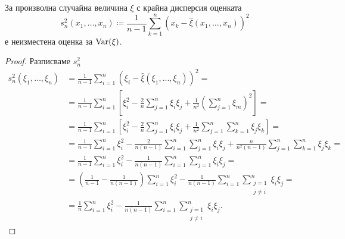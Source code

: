 \documentclass[numbers=endperiod, bibliography=totocnumbered]{scrartcl}
\begin{document}
\begin{proposition}\label{thm:corrected_variation_is_unbiased_estimator}
  За произволна случайна величина \( \xi \) с крайна дисперсия оценката
  \begin{equation*}
    s_n^2(x_1, \ldots, x_n) \coloneqq \frac 1 {n-1} \sum_{k=1}^n {(x_k - \hat \xi(x_1, \ldots, x_n))}^2
  \end{equation*}
  е неизместена оценка за \( \operatorname{Var}(\xi) \).
\end{proposition}
\begin{proof}
  Разписваме \( s_n^2 \)
  \begingroup
  \allowdisplaybreaks
  \begin{align*}
    s_n^2(\xi_1, \ldots, \xi_n)
    &=
    \frac 1 {n-1} \sum_{i=1}^n {(\xi_i - \hat \xi(\xi_1, \ldots, \xi_n))}^2
    = \\ &=
    \frac 1 {n-1} \sum_{i=1}^n \left[\xi_i^2 - \frac 2 n \sum_{j=1}^n \xi_i \xi_j + \frac 1 {n^2} {\left( \sum_{j=1}^n \xi_m \right)}^2 \right]
    = \\ &=
    \frac 1 {n-1} \sum_{i=1}^n \left[\xi_i^2 - \frac 2 n \sum_{j=1}^n \xi_i \xi_j + \frac 1 {n^2} \sum_{j=1}^n \sum_{k=1}^n \xi_j \xi_k \right]
    = \\ &=
    \frac 1 {n-1} \sum_{i=1}^n \xi_i^2 - \frac 2 {n(n-1)} \sum_{i=1}^n \sum_{j=1}^n \xi_i \xi_j + \frac n {n^2 (n-1)} \sum_{j=1}^n \sum_{k=1}^n \xi_j \xi_k
    = \\ &=
    \frac 1 {n-1} \sum_{i=1}^n \xi_i^2 - \frac 1 {n(n-1)} \sum_{i=1}^n \sum_{j=1}^n \xi_i \xi_j
    = \\ &=
    \left(\frac 1 {n-1} - \frac 1 {n(n-1)} \right) \sum_{i=1}^n \xi_i^2 - \frac 1 {n(n-1)} \sum_{i=1}^n \sum_{\substack{j=1 \\ j\neq i}}^n \xi_i \xi_j
    = \\ &=
    \frac 1 n \sum_{i=1}^n \xi_i^2 - \frac 1 {n(n-1)} \sum_{i=1}^n \sum_{\substack{j=1 \\ j\neq i}}^n \xi_i \xi_j.
  \end{align*}
  \endgroup


\end{proof}
\end{document}
